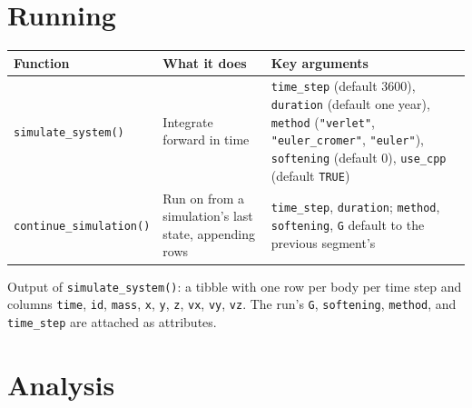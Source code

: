 \documentclass[
  10.5pt,
  letterpaper,
]{scrbook}
\newcounter{none} %
\theoremstyle{plain}
\theoremstyle{remark}
\begin{document}
\section{Running}\label{running}

{\def\LTcaptype{none} %
\begin{longtable}[]{@{}
  >{\raggedright\arraybackslash}p{}
  >{\raggedright\arraybackslash}p{}
  >{\raggedright\arraybackslash}p{}@{}}
\toprule\noalign{}
\begin{minipage}[b]{\linewidth}\raggedright
Function
\end{minipage} & \begin{minipage}[b]{\linewidth}\raggedright
What it does
\end{minipage} & \begin{minipage}[b]{\linewidth}\raggedright
Key arguments
\end{minipage} \\
\midrule\noalign{}
\endhead
\bottomrule\noalign{}
\endlastfoot
\texttt{simulate\_system()} & Integrate forward in time &
\texttt{time\_step} (default 3600), \texttt{duration} (default one
year), \texttt{method} (\texttt{"verlet"}, \texttt{"euler\_cromer"},
\texttt{"euler"}), \texttt{softening} (default 0), \texttt{use\_cpp}
(default \texttt{TRUE}) \\
\texttt{continue\_simulation()} & Run on from a simulation's last state,
appending rows & \texttt{time\_step}, \texttt{duration};
\texttt{method}, \texttt{softening}, \texttt{G} default to the previous
segment's \\
\end{longtable}
}

Output of \texttt{simulate\_system()}: a tibble with one row per body
per time step and columns \texttt{time}, \texttt{id}, \texttt{mass},
\texttt{x}, \texttt{y}, \texttt{z}, \texttt{vx}, \texttt{vy},
\texttt{vz}. The run's \texttt{G}, \texttt{softening}, \texttt{method},
and \texttt{time\_step} are attached as attributes.

\section{Analysis}\label{analysis}
\end{document}
